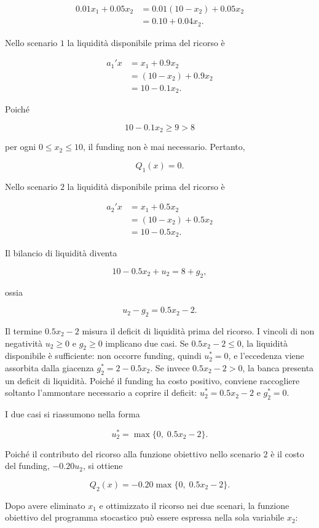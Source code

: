 \begin{enumerate}
\[
\begin{aligned}
0.01x_1+0.05x_2
&=
0.01(10-x_2)+0.05x_2
\\
&=
0.10+0.04x_2.
\end{aligned}
\]

Nello scenario $1$ la liquidit\`a
disponibile prima del ricorso \`e

\[
\begin{aligned}
a_1'x
&=
x_1+0.9x_2
\\
&=
(10-x_2)+0.9x_2
\\
&=
10-0.1x_2.
\end{aligned}
\]

Poich\'e

\[
10-0.1x_2\geq9>8
\]

per ogni $0\leq x_2\leq10$,
il funding non \`e mai necessario.
Pertanto,

\[
Q_1(x)=0.
\]

Nello scenario $2$ la liquidit\`a
disponibile prima del ricorso \`e

\[
\begin{aligned}
a_2'x
&=
x_1+0.5x_2
\\
&=
(10-x_2)+0.5x_2
\\
&=
10-0.5x_2.
\end{aligned}
\]

Il bilancio di liquidit\`a diventa

\[
10-0.5x_2+u_2
=
8+g_2,
\]

ossia

\[
u_2-g_2
=
0.5x_2-2.
\]

Il termine $0.5x_2-2$ misura il deficit
di liquidit\`a prima del ricorso. I vincoli
di non negativit\`a $u_2\geq0$ e $g_2\geq0$
implicano due casi. Se $0.5x_2-2\leq0$,
la liquidit\`a disponibile \`e sufficiente:
non occorre funding, quindi $u_2^*=0$,
e l'eccedenza viene assorbita dalla giacenza
$g_2^*=2-0.5x_2$. Se invece
$0.5x_2-2>0$, la banca presenta
un deficit di liquidit\`a. Poich\'e
il funding ha costo positivo, conviene
raccogliere soltanto l'ammontare necessario
a coprire il deficit: $u_2^*=0.5x_2-2$
e $g_2^*=0$.

I due casi si riassumono nella forma

\[
u_2^*
=
\max\{0,\;0.5x_2-2\}.
\]

Poich\'e il contributo del ricorso alla funzione obiettivo nello scenario $2$ \`e il costo del funding,  
$-0.20u_2$, si ottiene

\[
Q_2(x)
=
-0.20\max\{0,\;0.5x_2-2\}.
\]

Dopo avere eliminato $x_1$
e ottimizzato il ricorso nei due scenari,
la funzione obiettivo del programma stocastico
pu\`o essere espressa nella sola variabile $x_2$:


\end{enumerate}

